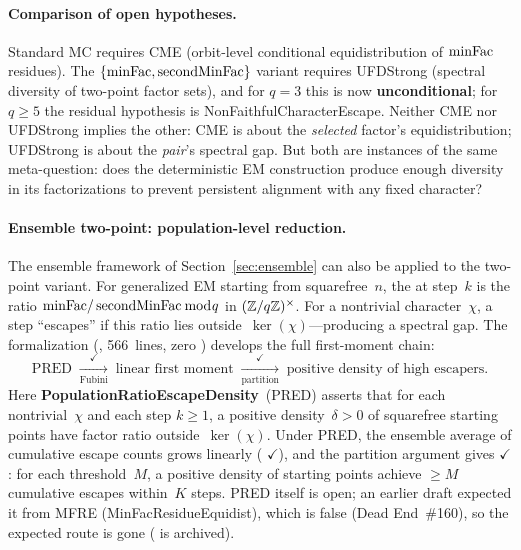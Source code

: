 \paragraph{Comparison of open hypotheses.}
Standard MC requires CME (orbit-level conditional equidistribution of
$\mathrm{minFac}$ residues).  The $\{\mathrm{minFac}, \operatorname{secondMinFac}\}$ variant
requires UFDStrong (spectral diversity of two-point factor sets), and
for $q = 3$ this is now \textbf{unconditional}; for $q \geq 5$ the
residual hypothesis is NonFaithfulCharacterEscape.
Neither CME nor UFDStrong implies the other: CME is about the
\emph{selected} factor's equidistribution; UFDStrong is about the
\emph{pair}'s spectral gap.
But both are instances of the same meta-question: does the deterministic
EM construction produce enough diversity in its factorizations to
prevent persistent alignment with any fixed character?

\paragraph{Ensemble two-point: population-level reduction.}
The ensemble framework of Section~\ref{sec:ensemble} can also be
applied to the two-point variant.  For generalized EM starting from
squarefree~$n$, the  at step~$k$ is the ratio
$\mathrm{minFac} / \operatorname{secondMinFac} \bmod q$ in
$(\mathbb{Z}/q\mathbb{Z})^\times$.  For a nontrivial character~$\chi$, a step
``escapes'' if this ratio lies outside~$\ker(\chi)$---producing a
spectral gap.  The formalization
(, 566~lines, zero )
develops the full first-moment chain:
\[
  \text{PRED}
  \;\xrightarrow[\text{Fubini}]{\checkmark}\;
  \text{linear first moment}
  \;\xrightarrow[\text{partition}]{\checkmark}\;
  \text{positive density of high escapers.}
\]
Here \textbf{PopulationRatioEscapeDensity}~(PRED) asserts that for
each nontrivial~$\chi$ and each step $k \geq 1$, a positive
density~$\delta > 0$ of squarefree starting points have factor ratio
outside~$\ker(\chi)$.  Under PRED, the ensemble average of cumulative
escape counts grows linearly
(
{\color{leanink}$\checkmark$}), and the partition argument gives
{\color{leanink}$\checkmark$}: for each threshold~$M$, a positive
density of starting points achieve $\geq M$ cumulative escapes
within~$K$ steps.  PRED itself is open; an earlier draft expected it
from MFRE (MinFacResidueEquidist), which is false (Dead End~\#160), so
the expected route is gone ( is
archived).

